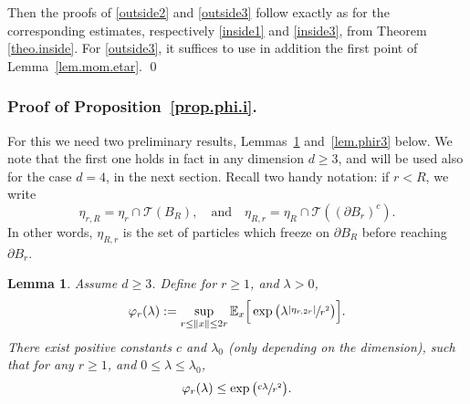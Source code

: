 \documentclass[11pt]{article}
\numberwithin{equation}{section}
\theoremstyle{plain}
\newtheorem{lemma}[theorem]{Lemma}
\theoremstyle{definition}
\newcommand{\1}{{\text{\Large $\mathfrak 1$}}}
\begin{document}
Then the proofs of \eqref{outside2} and \eqref{outside3} follow exactly as for the corresponding estimates, respectively \eqref{inside1} and \eqref{inside3}, from Theorem \ref{theo.inside}. For \eqref{outside3}, it suffices to use in addition the first point of Lemma~\ref{lem.mom.etar}.
\qed

\subsubsection*{Proof of Proposition~\ref{prop.phi.i}.}
For this we need two preliminary results,
Lemmas~\ref{lem.phir2} and~\ref{lem.phir3} below.
We note that the first one holds in fact in any dimension $d\ge 3$,
and will be used also for the case $d=4$, in the next section. Recall two handy
notation: if $r<R$, we write
\[
\eta_{r,R}=\eta_r\cap \mathcal T(B_R),\quad\text{and}\quad
\eta_{R,r}=\eta_R\cap \mathcal T((\partial B_r)^c).
\]
In other words, $\eta_{R,r}$ is the set of particles which freeze on $\partial B_R$ before reaching $\partial B_r$.
\begin{lemma}\label{lem.phir2} Assume $d\ge 3$.
Define for $r\ge 1$, and $\lambda>0$,
\[
\varphi_r(\lambda):= \sup_{r\le \|x\|\le 2r}
\mathbb E_x \Big[\exp\big(\lambda\sfrac{|\eta_{r,2r}|}{r^2}\big)\Big].
\]
There exist positive constants $c$ and $\lambda_0$
(only depending on the dimension),
such that for any $r\ge 1$, and $0\le \lambda\le \lambda_0$,
\[
\varphi_r(\lambda) \le \exp\big(\sfrac{c\lambda}{r^2}\big).
\]
\end{lemma}
\end{document}
